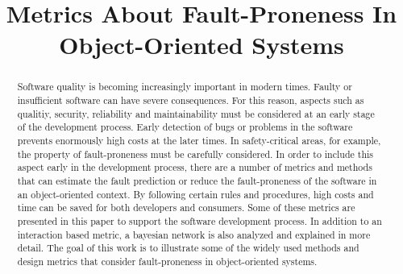 \documentclass[conference]{IEEEtran}
\begin{document}
\title{Metrics About Fault-Proneness In Object-Oriented Systems}

\author{
}

% 

\maketitle

\begin{abstract}
	Software quality is becoming increasingly important in modern times. Faulty or insufficient software can have severe consequences. For this reason, aspects such as qualitiy, security, reliability and maintainability must be considered at an early stage of the development process. Early detection of bugs or problems in the software prevents enormously high costs at the later times. In safety-critical areas, for example, the property of fault-proneness must be carefully considered. In order to include this aspect early in the development process, there are a number of metrics and methods that can estimate the fault prediction or reduce the fault-proneness of the software in an object-oriented context. By following certain rules and procedures, high costs and time can be saved for both developers and consumers. Some of these metrics are presented in this paper to support the software development process. In addition to an interaction based metric, a bayesian network is also analyzed and explained in more detail.
	The goal of this work is to illustrate some of the widely used methods and design metrics that consider fault-proneness in object-oriented systems.
	
\end{abstract}









%



\end{document}
